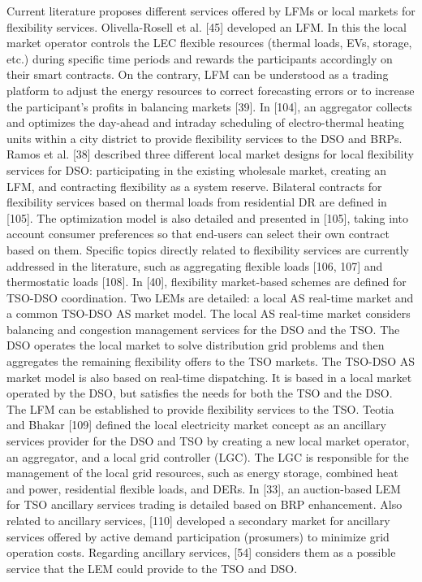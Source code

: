 Current literature proposes different services offered by LFMs or local markets for flexibility services. Olivella-Rosell et al. [45] developed an LFM. In this the local market operator controls the LEC flexible resources (thermal loads, EVs, storage, etc.) during specific time periods and rewards the participants accordingly on their smart contracts. On the contrary, LFM can be understood as a trading platform to adjust the energy resources to correct forecasting errors or to increase the participant's profits in balancing markets [39]. In [104], an aggregator collects and optimizes the day-ahead and intraday scheduling of electro-thermal heating units within a city district to provide flexibility services to the DSO and BRPs. Ramos et al. [38] described three different local market designs for local flexibility services for DSO: participating in the existing wholesale market, creating an LFM, and contracting flexibility as a system reserve. Bilateral contracts for flexibility services based on thermal loads from residential DR are defined in [105]. The optimization model is also detailed and presented in [105], taking into account consumer preferences so that end-users can select their own contract based on them. Specific topics directly related to flexibility services are currently addressed in the literature, such as aggregating flexible loads [106, 107] and thermostatic loads [108].
In [40], flexibility market-based schemes are defined for TSO-DSO coordination. Two LEMs are detailed: a local AS real-time market and a common TSO-DSO AS market model. The local AS real-time market considers balancing and congestion management services for the DSO and the TSO. The DSO operates the local market to solve distribution grid problems and then aggregates the remaining flexibility offers to the TSO markets. 
The TSO-DSO AS market model is also based on real-time dispatching. It is based in a local market operated by the DSO, but satisfies the needs for both the TSO and the DSO. The LFM can be established to provide flexibility services to the TSO. Teotia and Bhakar [109] defined the local electricity market concept as an ancillary services provider for the DSO and TSO by creating a new local market operator, an aggregator, and a local grid controller (LGC). The LGC is responsible for the management of the local grid resources, such as energy storage, combined heat and power, residential flexible loads, and DERs. In [33], an auction-based LEM for TSO ancillary services trading is detailed based on BRP enhancement. Also related to ancillary services, [110] developed a secondary market for ancillary services offered by active demand participation (prosumers) to minimize grid operation costs. Regarding ancillary services, [54] considers them as a possible service that the LEM could provide to the TSO and DSO.
